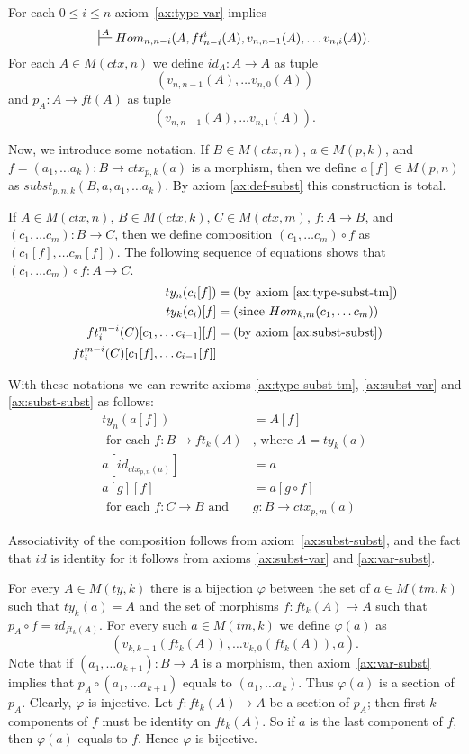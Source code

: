 \documentclass[reqno]{amsart}
\theoremstyle{definition}
\theoremstyle{remark}
\numberwithin{figure}{section}
\begin{document}
For each $0 \leq i \leq n$ axiom~\eqref{ax:type-var} implies
\[ \sststile{}{A} Hom_{n,n-i}(A, ft^i_{n-i}(A), v_{n,n-1}(A), \ldots v_{n,i}(A)). \]
For each $A \in M(ctx,n)$ we define $id_A : A \to A$ as tuple
\[ (v_{n,n-1}(A), \ldots v_{n,0}(A)) \]
and $p_A : A \to ft(A)$ as tuple
\[ (v_{n,n-1}(A), \ldots v_{n,1}(A)). \]

Now, we introduce some notation.
If $B \in M(ctx,n)$, $a \in M(p,k)$, and $f = (a_1, \ldots a_k) : B \to ctx_{p,k}(a)$ is a morphism, then we define $a[f] \in M(p,n)$ as $subst_{p,n,k}(B, a, a_1, \ldots a_k)$.
By axiom \eqref{ax:def-subst} this construction is total.

If $A \in M(ctx,n)$, $B \in M(ctx,k)$, $C \in M(ctx,m)$, $f : A \to B$, and $(c_1, \ldots c_m) : B \to C$,
    then we define composition $(c_1, \ldots c_m) \circ f$ as $(c_1[f], \ldots c_m[f])$.
The following sequence of equations shows that $(c_1, \ldots c_m) \circ f : A \to C$.
\begin{align*}
ty_n(c_i[f]) & = \text{(by axiom~\eqref{ax:type-subst-tm})} \\
ty_k(c_i)[f] & = \text{(since $Hom_{k,m}(c_1, \ldots c_m)$)} \\
ft^{m-i}_i(C)[c_1, \ldots c_{i-1}][f] & = \text{(by axiom~\eqref{ax:subst-subst})} \\
ft^{m-i}_i(C)[c_1[f], \ldots c_{i-1}[f]] &
\end{align*}

With these notations we can rewrite axioms \eqref{ax:type-subst-tm}, \eqref{ax:subst-var} and \eqref{ax:subst-subst} as follows:
\begin{align*}
ty_n(a[f]) & = A[f] \\
\text{ for each } f : B \to ft_k(A) & \text{, where } A = ty_k(a) \\
a[id_{ctx_{p,n}(a)}] & = a \\
a[g][f] & = a[g \circ f] \\
\text{ for each } f : C \to B \text{ and } & g : B \to ctx_{p,m}(a)
\end{align*}

Associativity of the composition follows from axiom~\eqref{ax:subst-subst}, and the fact that $id$ is identity for it follows from axioms \eqref{ax:subst-var} and \eqref{ax:var-subst}.

For every $A \in M(ty,k)$ there is a bijection $\varphi$ between the set of $a \in M(tm,k)$ such that $ty_k(a) = A$
    and the set of morphisms $f : ft_k(A) \to A$ such that $p_A \circ f = id_{ft_k(A)}$.
For every such $a \in M(tm,k)$ we define $\varphi(a)$ as
\[ (v_{k,k-1}(ft_k(A)), \ldots v_{k,0}(ft_k(A)), a). \]
Note that if $(a_1, \ldots a_{k+1}) : B \to A$ is a morphism, then axiom~\eqref{ax:var-subst} implies that $p_A \circ (a_1, \ldots a_{k+1})$ equals to $(a_1, \ldots a_k)$.
Thus $\varphi(a)$ is a section of $p_A$.
Clearly, $\varphi$ is injective.
Let $f : ft_k(A) \to A$ be a section of $p_A$; then first $k$ components of $f$ must be identity on $ft_k(A)$.
So if $a$ is the last component of $f$, then $\varphi(a)$ equals to $f$.
Hence $\varphi$ is bijective.
\end{document}
